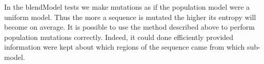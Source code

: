 \documentclass[a4paper,11pt,oneside]{article}
\begin{document}
In the blendModel tests we make mutations as if the population model were a
uniform model.  Thus the more a sequence is mutated the higher its entropy
will become on average.  It is possible to use the method described above to
perform population mutations correctly.  Indeed, it could done efficiently
provided information were kept about which regions of the sequence came from
which sub-model.


\end{document}
